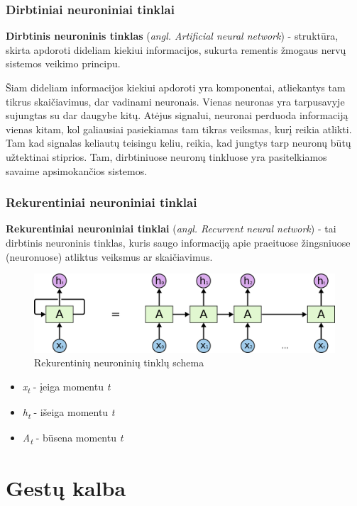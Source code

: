 \documentclass{VUMIFInfKursinis}
\begin{document}
\subsubsection{Dirbtiniai neuroniniai tinklai}
\textbf{Dirbtinis neuroninis tinklas} (\textit{angl. Artificial neural network}) - struktūra, skirta apdoroti dideliam kiekiui informacijos, sukurta rementis žmogaus nervų sistemos veikimo principu.

Šiam dideliam informacijos kiekiui apdoroti yra komponentai, atliekantys tam tikrus skaičiavimus, dar vadinami neuronais. Vienas neuronas yra tarpusavyje sujungtas su dar daugybe kitų. Atėjus signalui, neuronai perduoda informaciją vienas kitam, kol galiausiai pasiekiamas tam tikras veiksmas, kurį reikia atlikti. Tam kad signalas keliautų teisingu keliu, reikia, kad jungtys tarp neuronų būtų užtektinai stiprios. Tam, dirbtiniuose neuronų tinkluose yra pasitelkiamos savaime apsimokančios sistemos.


\subsubsection{Rekurentiniai neuroniniai tinklai}
\textbf{Rekurentiniai neuroniniai tinklai} (\textit{angl. Recurrent neural network}) - tai dirbtinis neuroninis tinklas, kuris saugo informaciją apie praeituose žingsniuose (neuronuose) atliktus veiksmus ar skaičiavimus.

\begin{figure}[H]
	\centering
	\includegraphics[width=.8\linewidth]{img/rnn}
	\caption{Rekurentinių neuroninių tinklų schema \cite{RecurrentNeuralNetwork}}
	\label{img:rnn}
	
\end{figure}
\begin{itemize}
	\item \textit{x\textsubscript{t}} - įeiga momentu \textit{t}
	\item \textit{h\textsubscript{t}} - išeiga momentu \textit{t}	
	\item \textit{A\textsubscript{t}} - būsena momentu \textit{t}	
\end{itemize}




\section{Gestų kalba}
\end{document}
